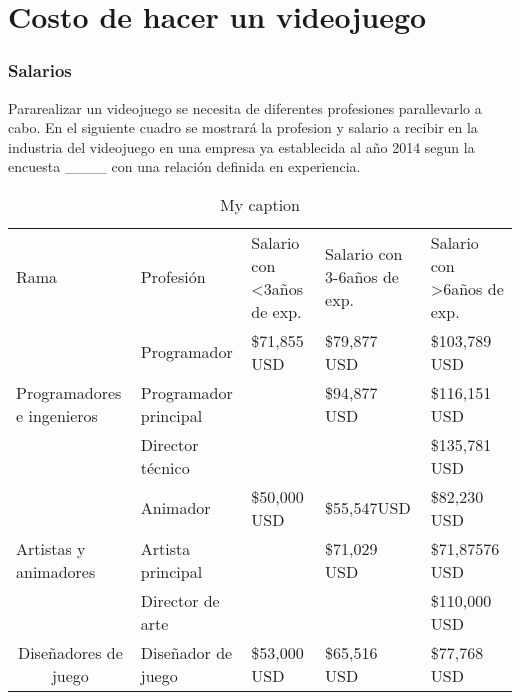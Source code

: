\section{Costo de hacer un videojuego}\label{costoVJ}

	
\subsubsection{Salarios}
Pararealizar un videojuego se necesita de diferentes profesiones parallevarlo a cabo.
En el siguiente cuadro se mostrará la profesion y salario a recibir en la industria del videojuego en una empresa ya establecida al año 2014 segun la encuesta ____ con una relación definida en experiencia.


\begin{table}[]
	\centering
	\caption{My caption}
	\label{my-label}
	\begin{tabular}{lllll}
		Rama                                                      & Profesión                   & Salario con \textless 3años de exp. & Salario con 3-6años de exp. & Salario con \textgreater 6años de exp. \\
		\multirow{3}{*}{Programadores e ingenieros}               & Programador                 & \$71,855 USD                        & \$79,877 USD                & \$103,789 USD                          \\
		& Programador principal       &                                     & \$94,877 USD                & \$116,151 USD                          \\
		& Director técnico            &                                     &                             & \$135,781 USD                          \\
		\multirow{3}{*}{Artistas y animadores}                    & Animador                    & \$50,000 USD                        & \$55,547USD                 & \$82,230 USD                           \\
		& Artista principal           &                                     & \$71,029 USD                & \$71,87576 USD                         \\
		& Director de arte            &                                     &                             & \$110,000 USD                          \\
		\multicolumn{1}{c}{\multirow{2}{*}{Diseñadores de juego}} & Diseñador de juego          & \$53,000 USD                        & \$65,516 USD                & \$77,768 USD                           \\

\end{tabular}
\end{table}
